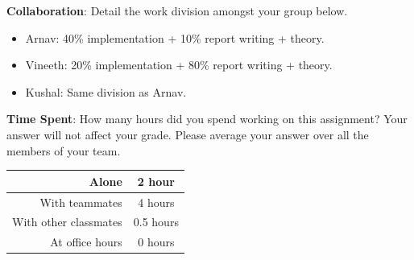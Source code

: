 \documentclass[12pt]{article}
\begin{document}
\textbf{Collaboration}: Detail the work division amongst your group below.
\begin{solution}[height=4cm]
\begin{itemize}
    \item Arnav: 40\% implementation + 10\% report writing + theory. 
    \item Vineeth: 20\% implementation + 80\% report writing + theory.
    \item Kushal: Same division as Arnav.
\end{itemize}
\end{solution}

\noindent\textbf{Time Spent}: How many hours did you spend working on this assignment? Your answer will not affect your grade. Please average your answer over all the members of your team.
\begin{solution}[height=4cm]
\begin{table}[H]
    \centering
    \begin{tabular}{r|c}
        Alone & 2 hour \hspace{3em} %
        \\ \hline
        With teammates & 4 hours \hspace{3em} %
        \\ \hline
        With other classmates & 0.5 hours \hspace{3em} %
        \\ \hline
        At office hours & 0 hours \hspace{3em} %
        \\ \hline
    \end{tabular}
\end{table}
\end{solution}
\end{document}
